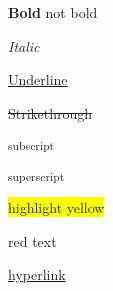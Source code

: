 \documentclass{article}
\begin{document}
	\textbf{Bold }not bold



	\emph{Italic}



	\underline{Underline}



	\sout{Strikethrough}



	\textsubscript{subscript}



	\textsuperscript{superscript}



	\colorbox{yellow}{highlight yellow}



	red text










	\href{https://hyperlink.com/}{hyperlink}
\end{document}
